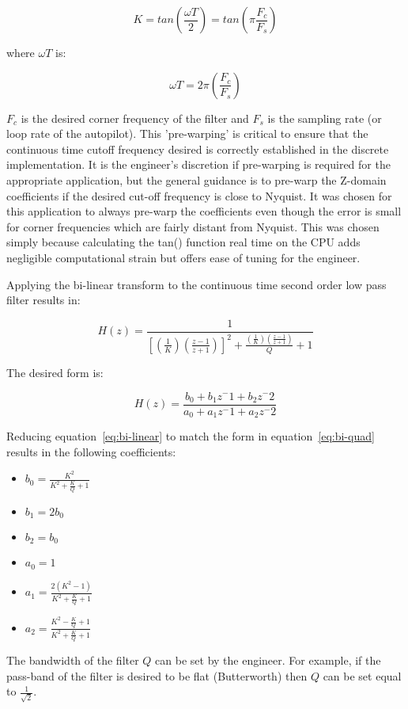 \begin{equation}
	K = tan\left(\frac{\omega T}{2}\right) = tan\left(\pi\frac{F_c}{F_s}\right)
\end{equation}

where $\omega T$ is:

\begin{equation}
	\omega T = 2\pi\left(\frac{F_c}{F_s}\right)
\end{equation}

$F_c$ is the desired corner frequency of the filter and $F_s$ is the sampling rate (or loop rate of the autopilot).
This 'pre-warping' is critical to ensure that the continuous time cutoff frequency desired is correctly established in the discrete implementation.  It is the engineer's discretion if pre-warping is required for the appropriate application, but the general guidance is to pre-warp the Z-domain coefficients if the desired cut-off frequency is close to Nyquist.  It was chosen for this application to always pre-warp the coefficients even though the error is small for corner frequencies which are fairly distant from Nyquist.  This was chosen simply because calculating the tan() function real time on the CPU adds negligible computational strain but offers ease of tuning for the engineer.

Applying the bi-linear transform to the continuous time second order low pass filter results in:

\begin{equation}\label{eq:bi-linear}
	H(z) = \frac{1}{ \left[\left(\frac{1}{K}\right)\left(\frac{z-1}{z+1}\right)\right]^2+\frac{ \left(\frac{1}{K}\right)\left(\frac{z-1}{z+1}\right)}{Q}+1}
\end{equation}

The desired form is:

\begin{equation}\label{eq:bi-quad}
	H(z) = \frac{b_0 + b_1 z^-1 + b_2 z^-2}{a_0 + a_1 z^-1 + a_2 z^-2}
\end{equation}

Reducing equation~\ref{eq:bi-linear} to match the form in equation~\ref{eq:bi-quad} results in the following coefficients:

\begin{itemize}
	\item[] $b_0 = \frac{K^2}{K^2+\frac{K}{Q}+1}$
	\item[] $b_1 = 2b_0$
	\item[] $b_2 = b_0$
	\item[] $a_0 = 1$
	\item[] $a_1 = \frac{2(K^2-1)}{K^2+\frac{K}{Q}+1}$
	\item[] $a_2 = \frac{K^2-\frac{K}{Q}+1}{K^2+\frac{K}{Q}+1}$
\end{itemize}

The bandwidth of the filter $Q$ can be set by the engineer.  For example, if the pass-band of the filter is desired to be flat (Butterworth) then $Q$ can be set equal to $\frac{1}{\sqrt{2}}$.


















